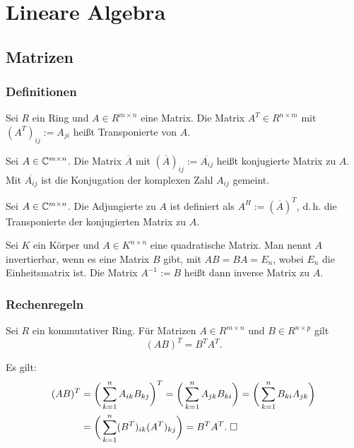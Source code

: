 
\chapter{Lineare Algebra}
\section{Matrizen}
\subsection{Definitionen}
\begin{Definition}%
Sei $R$ ein Ring und $A\in R^{m\times n}$ eine Matrix.
Die Matrix $A^T\in R^{n\times m}$ mit $(A^T)_{ij} := A_{ji}$
heißt Transponierte von $A$.
\end{Definition}

\begin{Definition}%
Sei $A\in\mathbb C^{m\times n}$. Die Matrix $\overline A$ mit
$(\overline A)_{ij} := \overline{A_{ij}}$
heißt konjugierte Matrix zu $A$. Mit $\overline{A_{ij}}$ ist
die Konjugation der komplexen Zahl $A_{ij}$ gemeint.
\end{Definition}

\begin{Definition}%
Sei $A\in\mathbb C^{m\times n}$. Die Adjungierte zu $A$ ist
definiert als $A^H:=(\overline A)^T$, d.\,h.
die Transponierte der konjugierten Matrix zu $A$.
\end{Definition}

\begin{Definition}%
\label{matrix-inv}
Sei $K$ ein Körper und $A\in K^{n\times n}$ eine quadratische
Matrix. Man nennt $A$ invertierbar, wenn es eine Matrix $B$ gibt,
mit $AB=BA=E_n$, wobei $E_n$ die Einheitsmatrix ist. Die Matrix
$A^{-1}:=B$ heißt dann inverse Matrix zu $A$.
\end{Definition}

\subsection{Rechenregeln}

\begin{Satz}\label{matrix-mul-tp}
Sei $R$ ein kommutativer Ring. Für Matrizen $A\in R^{m\times n}$ und
$B\in R^{n\times p}$ gilt
\[(AB)^T = B^T A^T.\]
\end{Satz}
\begin{Beweis} Es gilt:
\begin{align}
(AB)^T &= \bigg(\sum_{k=1}^n A_{ik}B_{kj}\bigg)^T
= \bigg(\sum_{k=1}^n A_{jk}B_{ki}\bigg)
= \bigg(\sum_{k=1}^n B_{ki} A_{jk}\bigg)\\
&= \bigg(\sum_{k=1}^n (B^T)_{ik} (A^T)_{kj}\bigg)
= B^T A^T.\;\square
\end{align}
\end{Beweis}


